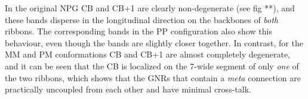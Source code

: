In the original NPG CB and CB+1 are clearly non-degenerate (see fig **), and these bands disperse in the longitudinal direction on
the backbones of \textit{both} ribbons. The corresponding bands in the PP configuration also show this behaviour, even though the bands are slightly closer together. In contrast,
for the MM and PM conformations CB and CB+1 are almost completely degenerate, and it can be seen that the CB is localized on the 7-wide segment of only \textit{one} of the two ribbons\parencite{Kretz2018}, which shows that the GNRs that contain a \textit{meta} connection are practically uncoupled from each other and have minimal cross-talk.




